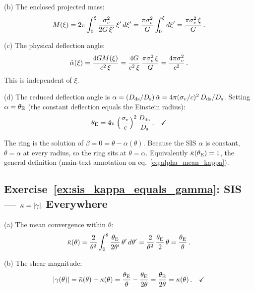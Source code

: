 (b) The enclosed projected mass:
\begin{equation*}
    M(\xi) = 2\pi \int_0^\xi \frac{\sigma_v^2}{2G\,\xi'}\,
    \xi'\, d\xi'
    = \frac{\pi\sigma_v^2}{G} \int_0^\xi d\xi'
    = \frac{\pi\sigma_v^2\,\xi}{G} \,.
\end{equation*}

(c) The physical deflection angle:
\begin{equation*}
    \hat{\alpha}(\xi) = \frac{4G M(\xi)}{c^2\,\xi}
    = \frac{4G}{c^2\,\xi}\,
    \frac{\pi\sigma_v^2\,\xi}{G}
    = \frac{4\pi\sigma_v^2}{c^2} \,.
\end{equation*}
This is independent of $\xi$. \checkmark

(d) The reduced deflection angle is
$\alpha = (D_{\mathrm{ds}}/D_{\mathrm{s}})\,\hat{\alpha} = 4\pi(\sigma_v/c)^2\,
D_{\mathrm{ds}}/D_{\mathrm{s}}$.  Setting $\alpha = \thetaE$ (the constant deflection equals
the Einstein radius):
\begin{equation*}
    \theta_{\mathrm{E}} = 4\pi\left(\frac{\sigma_v}{c}\right)^2
    \frac{D_{\mathrm{ds}}}{D_{\mathrm{s}}} \,. \quad \checkmark
\end{equation*}

\begin{annotation}[Why ``$\alpha = \thetaE$'' is the Einstein-radius condition]
The ring is the solution of $\beta = 0 = \theta-\alpha(\theta)$.  Because the
SIS $\alpha$ is constant, $\theta = \alpha$ at every radius, so the ring sits
at $\theta = \alpha$.  Equivalently $\bar\kappa(\theta_{\mathrm{E}}) = 1$, the general
definition (main-text annotation on eq.~\eqref{eq:alpha_mean_kappa}).
\end{annotation}


\subsection*{Exercise~\ref{ex:sis_kappa_equals_gamma}: SIS --- $\kappa = |\gamma|$ Everywhere}

(a) The mean convergence within $\theta$:
\begin{equation*}
    \bar{\kappa}(\theta) = \frac{2}{\theta^2}
    \int_0^\theta \frac{\theta_{\mathrm{E}}}{2\theta'}\, \theta'\, d\theta'
    = \frac{2}{\theta^2}\, \frac{\theta_{\mathrm{E}}}{2}\, \theta
    = \frac{\theta_{\mathrm{E}}}{\theta} \,.
\end{equation*}

(b) The shear magnitude:
\begin{equation*}
    |\gamma(\theta)| = \bar{\kappa}(\theta) - \kappa(\theta)
    = \frac{\theta_{\mathrm{E}}}{\theta} - \frac{\theta_{\mathrm{E}}}{2\theta}
    = \frac{\theta_{\mathrm{E}}}{2\theta}
    = \kappa(\theta) \,. \quad \checkmark
\end{equation*}

